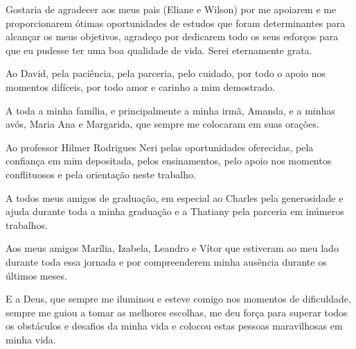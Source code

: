 \begin{agradecimentos}

Gostaria de agradecer aos meus pais (Eliane e Wilson) por me apoiarem e me proporcionarem ótimas oportunidades
de estudos que foram determinantes para alcançar os meus objetivos,  agradeço por dedicarem todo os seus esforços para que eu pudesse ter uma boa qualidade de vida.
Serei eternamente grata.

Ao David, pela paciência, pela parceria, pelo cuidado, por todo o apoio nos momentos difíceis, por todo amor e carinho a mim demostrado.

A toda a minha família, e principalmente a minha irmã, Amanda, e a minhas avós, Maria Ana e Margarida, que sempre me colocaram em suas orações.

Ao professor Hilmer Rodrigues Neri pelas oportunidades oferecidas, pela confiança em mim depositada, pelos ensinamentos, pelo apoio nos momentos conflituosos e pela orientação neste trabalho.

A todos meus amigos de graduação, em especial ao Charles pela generosidade e ajuda durante toda a minha graduação e a Thatiany pela parceria em inúmeros trabalhos.

Aos meus amigos Marília, Izabela, Leandro e Vítor que estiveram ao meu lado durante toda essa jornada e por compreenderem minha ausência durante os últimos meses.

E a Deus, que sempre me iluminou e esteve comigo nos momentos de dificuldade, sempre me guiou a tomar as melhores escolhas, me deu força para superar todos os obstáculos e 
desafios da minha vida e colocou estas pessoas maravilhosas em minha vida.

\end{agradecimentos}
